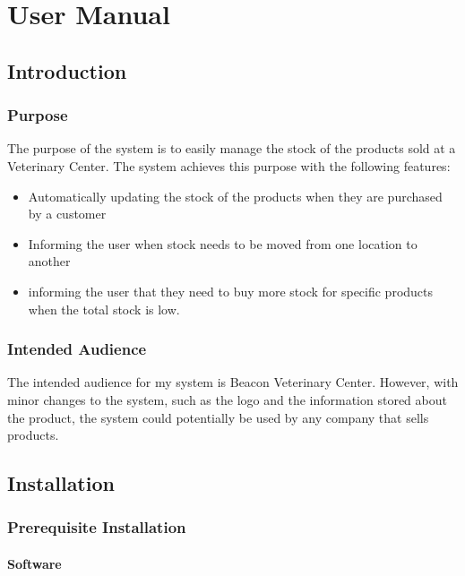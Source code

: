 

\chapter{User Manual}

\startcontents
{}

\section{Introduction}

\subsection{Purpose}

The purpose of the system is to easily manage the stock of the products sold at a Veterinary Center. The system achieves this purpose with the following features:

\begin{itemize}
\item{Automatically updating the stock of the products when they are purchased by a customer}
\item{Informing the user when stock needs to be moved from one location to another}
\item{informing the user that they need to buy more stock for specific products when the total stock is low.}
\end{itemize}

\subsection{Intended Audience}

The intended audience for my system is Beacon Veterinary Center. However, with minor changes to the system, such as the logo and the information stored about the product, the system could potentially be used by any company that sells products. 

\section{Installation}

\subsection{Prerequisite Installation}
\subsubsection{Software}

